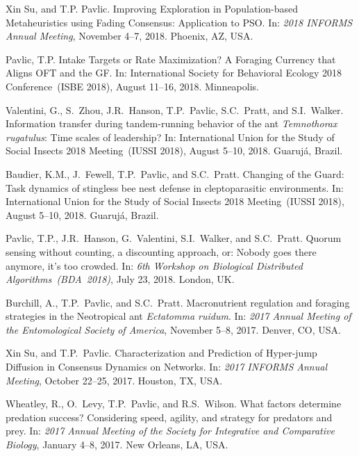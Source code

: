 \documentclass[10pt]{article}
\begin{document}
\begin{bibenum}
    \item Xin Su, and T.P. Pavlic. Improving Exploration in
        Population-based Metaheuristics using Fading Consensus:
        Application to PSO. In: \emph{2018 INFORMS Annual Meeting},
        November 4--7, 2018. Phoenix, AZ, USA.

    \item Pavlic, T.P. Intake Targets or Rate Maximization? A Foraging
        Currency that Aligns OFT and the GF. In: International Society
        for Behavioral Ecology 2018 Conference~(ISBE 2018), August
        11--16, 2018. Minneapolis.

    \item Valentini, G., S.~Zhou, J.R.~Hanson, T.P.~Pavlic, S.C.~Pratt,
        and S.I.~Walker. Information transfer during tandem-running
        behavior of the ant \emph{Temnothorax rugatulus}: Time scales of
        leadership? In: International Union for the Study of Social
        Insects 2018 Meeting~(IUSSI 2018), August 5--10, 2018.
        Guaruj{\'{a}}, Brazil.

    \item Baudier, K.M., J.~Fewell, T.P.~Pavlic, and S.C.~Pratt.
        Changing of the Guard: Task dynamics of stingless bee nest
        defense in cleptoparasitic environments. In: International Union
        for the Study of Social Insects 2018 Meeting~(IUSSI 2018),
        August 5--10, 2018. Guaruj{\'{a}}, Brazil.

    \item Pavlic, T.P., J.R.~Hanson, G.~Valentini, S.I.~Walker, and
        S.C.~Pratt. Quorum sensing without counting, a discounting
        approach, or: Nobody goes there anymore, it's too crowded. In:
        \emph{6th Workshop on Biological Distributed
        Algorithms~(BDA~2018)}, July 23, 2018. London, UK.

    \item Burchill, A., T.P.~Pavlic, and S.C.~Pratt. Macronutrient
        regulation and foraging strategies in the Neotropical ant
        \emph{Ectatomma ruidum}. In: \emph{2017 Annual Meeting of the
        Entomological Society of America}, November 5--8, 2017. Denver,
        CO, USA.

    \item Xin Su, and T.P.~Pavlic. Characterization and Prediction of
        Hyper-jump Diffusion in Consensus Dynamics on Networks. In:
        \emph{2017 INFORMS Annual Meeting}, October 22--25, 2017.
        Houston, TX, USA.

    \item Wheatley, R., O.~Levy, T.P.~Pavlic, and R.S.~Wilson. What
        factors determine predation success? Considering speed, agility,
        and strategy for predators and prey. In: \emph{2017
        Annual Meeting of the Society for Integrative and Comparative
        Biology}, January 4--8, 2017. New Orleans, LA, USA.


\end{bibenum}
\end{document}
